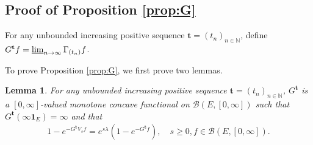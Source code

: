 \documentclass[12pt,a4paper]{amsart}
\numberwithin{equation}{section}
\theoremstyle{plain}
\newtheorem{lem}[thm]{Lemma}
\theoremstyle{definition}
\theoremstyle{remark}
\begin{document}
\subsection{Proof of Proposition \ref{prop:G}}\label{sec:G}
	For any unbounded increasing positive sequence $\mathbf t = (t_n)_{n\in \mathbb N}$, define $G^\mathbf t f = \varliminf_{n\to \infty} \Gamma_{(t_n)} f$.

	To prove Proposition \ref{prop:G}, we first prove two lemmas.

\begin{lem} \label{prop:Gtb:H1:H2:H3:H4}
	For any unbounded increasing positive sequence $\mathbf t = (t_n)_{n\in \mathbb N}$,
	$G^\mathbf t$ is a $[0,\infty]$-valued monotone concave functional on $\mathcal B(E,[0,\infty])$ 
	such that $G^{\mathbf t}(\infty \mathbf 1_E) = \infty$ and that
	\begin{align}
	1 - e^{-G^\mathbf t V_s f}
	= e^{s\lambda} (1-e^{- G^\mathbf t f}),
	\quad s\geq 0, f\in \mathcal B(E,[0,\infty]).
	\end{align}
\end{lem}
\end{document}
